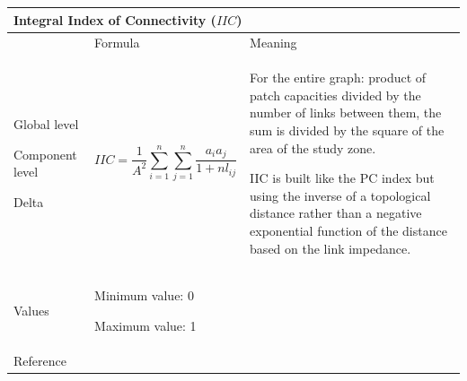 \documentclass{article}
\begin{document}
\begin{table}[H]
\begin{tabular}{|m{3.24cm}|m{4.4810004cm}m{7.924cm}|}
\hline
\multicolumn{3}{|m{16.044998cm}|}{Integral Index of Connectivity
($IIC$)}\\\hline
 &
\multicolumn{1}{m{4.4810004cm}|}{Formula} &
Meaning\\\hline
Global level

Component level

Delta &
\multicolumn{1}{m{4.4810004cm}|}{\begin{equation*}
\mathit{IIC}=\frac{1}{{A}^{2}}\sum _{i=1}^{n}{\sum
_{j=1}^{n}{{\frac{{a}_{i}{a}_{j}}{{1+\mathit{nl}}_{\mathit{ij}}}}}}
\end{equation*}
} &
For the entire graph: product of patch capacities divided by the number
of links between them, the sum is divided by the square of the area of
the study zone.

IIC is built like the PC index but using the inverse of a topological
distance rather than a negative exponential function of the distance
based on the link impedance.

\\\hline
Values &
\multicolumn{2}{m{12.6050005cm}|}{Minimum value: 0

Maximum value: 1
}\\\hline
Reference &
\multicolumn{2}{m{12.6050005cm}|}{\cite{Pascual2006}}\\\hline
\end{tabular}
\end{table}
\end{document}
